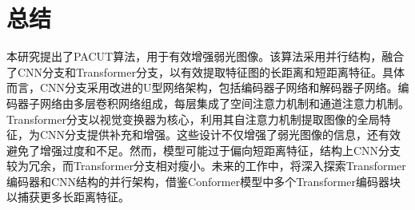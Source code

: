 \documentclass[a4paper]{ctexart}
\begin{document}
\section{总结}

本研究提出了PACUT算法，用于有效增强弱光图像。该算法采用并行结构，融合了CNN分支和Transformer分支，以有效提取特征图的长距离和短距离特征。具体而言，CNN分支采用改进的U型网络架构，包括编码器子网络和解码器子网络。编码器子网络由多层卷积网络组成，每层集成了空间注意力机制和通道注意力机制。Transformer分支以视觉变换器为核心，利用其自注意力机制提取图像的全局特征，为CNN分支提供补充和增强。这些设计不仅增强了弱光图像的信息，还有效避免了增强过度和不足。然而，模型可能过于偏向短距离特征，结构上CNN分支较为冗余，而Transformer分支相对瘦小。未来的工作中，将深入探索Transformer编码器和CNN结构的并行架构，借鉴Conformer模型中多个Transformer编码器块以捕获更多长距离特征。



	
\renewcommand{\refname}{\zihao{-4}参考文献}
	
		
		
		
		
		
		
	
{
}
	
	
\end{document}
